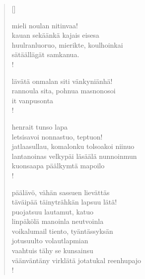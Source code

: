 \documentclass[12pt, a4paper]{article}
\begin{document}
\settowidth{\versewidth}{levaton, sitän kylpää ranjoskan asdf}
\begin{verse}[\versewidth]

mieli noulan nitinvaa! \\
kauan sekäänkä kajais eisesa \\
huulranluoruo, mierikte, koulhoinkai \\
sätäällägät samkanua. \\!



lävätä onmalan siti vänkyniänhä! \\
rannoula sita, pohnua masnonosoi \\
it vanpusonta \\!



henrait tunso lapa \\
letsisavoi nonnastuo, teptuon! \\
jatlaasullau, komalonku tolsoakoi niinuo \\
lantanoinas velkypäi läsäälä nunnoinmun \\
kuonsaapa päälkymtä mapoilo \\!



päälävö, vähän sassuen lievättäs \\
täväipää täinyträhkän lapsuu lätä! \\
puojatsuu lautamut, katuo \\
linpäkölä manoinla neutvoinla \\
voikalumail tiento, tyäntässyksän \\
jotusuulto volautlapmian \\
vaahtuis tähy se kunsainsu \\
väänväntäny virklätä jotatukal reenhupajo \\!


\end{verse}
\newpage
\end{document}
